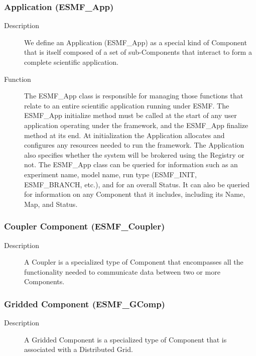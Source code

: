 \subsubsection{Application (ESMF\_App)}
\begin{description} 
\item [Description] We define an Application (ESMF\_App) as a special kind of Component 
that is itself composed of a set of sub-Components that interact to form a complete scientific
application.  
\item [Function] The ESMF\_App class is responsible for managing those functions that relate 
to an entire scientific application running under ESMF.  The ESMF\_App initialize method 
must be called at the start of any user application operating under the framework, and
the ESMF\_App finalize method at its end.  At initialization the Application allocates and 
configures any resources needed to run the framework.  The Application also specifies whether 
the system will be brokered using the Registry or not.  The ESMF\_App class can be queried 
for information such as an experiment name, model name, run type (ESMF\_INIT, 
ESMF\_BRANCH, etc.), and for an overall Status.  It can also be queried for
information on any Component that it includes, including its Name, Map, and
Status.
\end{description}

\subsubsection{Coupler Component (ESMF\_Coupler)}
\begin{description}
\item [Description] A Coupler is a specialized type of Component that encompasses all the 
functionality needed to communicate
data between two or more Components. 
\end{description}

\subsubsection{Gridded Component (ESMF\_GComp)} 
\label{sec:gridcomp}
\begin{description}
\item [Description] A Gridded Component is a specialized type of Component that is associated
with a Distributed Grid.  
\end{description}

